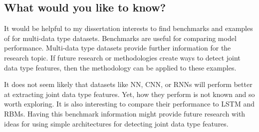 \subsection{What would you like to know?}

It would be helpful to my dissertation interests to find benchmarks and examples of for multi-data type datasets.   Benchmarks are useful for comparing model performance.  Multi-data type datasets provide further information for the research topic.  If future research or methodologies create ways to detect joint data type features, then the methodology can be applied to these examples.  

It does not seem likely that datasets like NN, CNN, or RNNs will perform better at extracting joint data type features.  Yet, how they perform is not known and so worth exploring.  It is also interesting to compare their performance to LSTM and RBMs.  Having this benchmark information might provide future research with ideas for using simple architectures for detecting joint data type features. 
